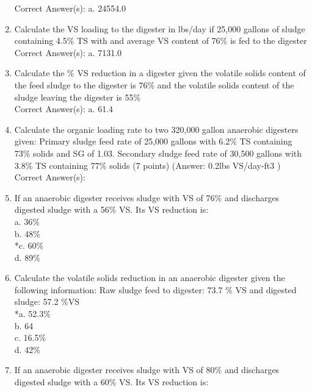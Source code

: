 \documentclass{article}
\begin{document}
\begin{enumerate}
Correct Answer(s):
a. 24554.0 \\

\item  Calculate the VS loading to the digester in lbs/day if 25,000 gallons of sludge containing 4.5\% TS with and average VS content of 76\% is fed to the digester \\

Correct Answer(s):
a. 7131.0 \\

\item  Calculate the \% VS reduction in a digester given the volatile solids content of the feed sludge to the digester is 76\% and the volatile solids content of the sludge leaving the digester is 55\% \\

Correct Answer(s):
a. 61.4 \\

\item  Calculate the organic loading rate to two 320,000 gallon anaerobic digesters given:
Primary sludge feed rate of 25,000 gallons with 6.2\% TS containing 73\% solids and SG of 1.03.
Secondary sludge feed rate of 30,500 gallons with 3.8\% TS containing 77\% solids (7 points)
(Answer: 0.2lbs VS/day-ft3 ) \\

Correct Answer(s): \\

\item  If an anaerobic digester receives sludge with VS of 76\% and discharges digested sludge with a 56\% VS.  Its VS reduction is: \\

a. 36\% \\
b. 48\% \\
*c. 60\% \\
d. 89\% \\

\item  Calculate the volatile solids reduction in an anaerobic digester given the following information:  Raw sludge feed to digester:  73.7 \% VS and digested sludge: 57.2 \%VS \\

*a. 52.3\% \\
b. 64 \\
c. 16.5\% \\
d. 42\% \\

\item  If an anaerobic digester receives sludge with VS of 80\% and discharges digested sludge with a 60\% VS.  Its VS reduction is: \\


\end{enumerate}
\end{document}

